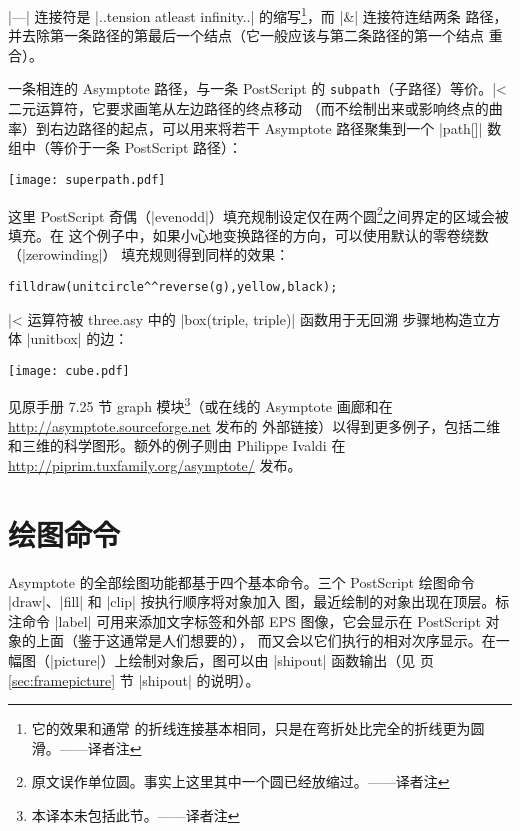 \documentclass[nofonts,CJKnormalspaces]{ctexbook}[2009/05/20]
\newcommand*\prgname[1]{\textsf{#1}}
\newcommand\transnote[1]{\footnote{#1——译者注}}
\begin{document}
|---| 连接符是 |..tension atleast infinity..| 的缩写\transnote{它的效果和通常
的折线连接基本相同，只是在弯折处比完全的折线更为圆滑。}，而 |&| 连接符连结两条
路径，并去除第一条路径的第最后一个结点（它一般应该与第二条路径的第一个结点
重合）。

一条相连的 \prgname{Asymptote} 路径，与一条 \prgname{PostScript} 的
\verb=subpath=（子路径）等价。|^^| 二元运算符，它要求画笔从左边路径的终点移动
（而不绘制出来或影响终点的曲率）到右边路径的起点，可以用来将若干
\prgname{Asymptote} 路径聚集到一个 |path[]| 数组中（等价于一条
\prgname{PostScript} 路径）：

\begin{center}
  \texttt{[image: superpath.pdf]}
\end{center}

这里 \prgname{PostScript} 奇偶（|evenodd|）填充规制设定仅在两个圆\transnote{%
原文误作单位圆。事实上这里其中一个圆已经放缩过。}之间界定的区域会被填充。在
这个例子中，如果小心地变换路径的方向，可以使用默认的零卷绕数（|zerowinding|）
填充规则得到同样的效果：
\begin{lstlisting}
filldraw(unitcircle^^reverse(g),yellow,black);
\end{lstlisting}
|^^| 运算符被 \prgname{three.asy} 中的 |box(triple, triple)| 函数用于无回溯
步骤地构造立方体 |unitbox| 的边：

\begin{center}
  \texttt{[image: cube.pdf]}
\end{center}

见原手册 7.25 节 graph 模块\transnote{本译本未包括此节。}（或在线的
\prgname{Asymptote} 画廊和在 \url{http://asymptote.sourceforge.net} 发布的
外部链接）以得到更多例子，包括二维和三维的科学图形。额外的例子则由 Philippe
Ivaldi 在 \url{http://piprim.tuxfamily.org/asymptote/} 发布。



\chapter{绘图命令}
\label{chap:drawingcommands}

\prgname{Asymptote} 的全部绘图功能都基于四个基本命令。三个
\prgname{PostScript} 绘图命令 |draw|、|fill| 和 |clip| 按执行顺序将对象加入
图，最近绘制的对象出现在顶层。标注命令 |label| 可用来添加文字标签和外部 EPS
图像，它会显示在 \prgname{PostScript} 对象的上面（鉴于这通常是人们想要的），
而又会以它们执行的相对次序显示。在一幅图（|picture|）上绘制对象后，图可以由
|shipout| 函数输出（见 \pageref{sec:framepicture} 页
\ref{sec:framepicture} 节 |shipout| 的说明）。
\end{document}
